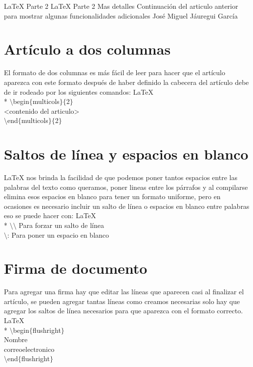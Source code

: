 
\Chapter%
         {\LaTeX{} Parte 2}%
         {\LaTeX{} Parte 2 Mas detalles}%
         {Continuación del articulo anterior para mostrar algunas funcionalidades
         adicionales}%
         {José Miguel Jáuregui García}%

\begin{multicols}{2}

\section*{Artículo a dos columnas}
El formato de dos columnas es más fácil de leer para hacer que el artículo aparezca
con este formato después de haber definido la cabecera del artículo debe de ir
rodeado por los siguientes comandos:
\Code
   {LaTeX}
   {
   \\*
   $\setminus$begin$\{$multicols$\}\{$2$\}$ \\
   <contenido del articulo> \\
   $\setminus$end$\{$multicols$\}\{$2$\}$
   }

\section*{Saltos de línea y espacios en blanco}
\LaTeX{} nos brinda la facilidad de que podemos poner tantos espacios entre las palabras
del texto como queramos, poner lineas entre los párrafos y al compilarse elimina esos
espacios en blanco para tener un formato uniforme, pero en ocasiones es necesario incluir
un salto de línea o espacios en blanco entre palabras eso se puede hacer con:
\Code
   {LaTeX}
   {
   \\*
   $\setminus\setminus$ Para forzar un salto de línea\\
   $\setminus$: Para poner un espacio en \: blanco \\
   }

\section*{Firma de documento}
Para agregar una firma hay que editar las líneas que aparecen casi al finalizar el artículo,
se pueden agregar tantas líneas como creamos necesarias solo hay que agregar los saltos
de línea necesarios para que aparezca con el formato correcto.
\Code
   {LaTeX}
   {
   \\*
	$\setminus$begin$\{$flushright$\}$ \\
	Nombre \\
	correoelectronico \\
	$\setminus$end$\{$flushright$\}$
   }



\end{multicols}
